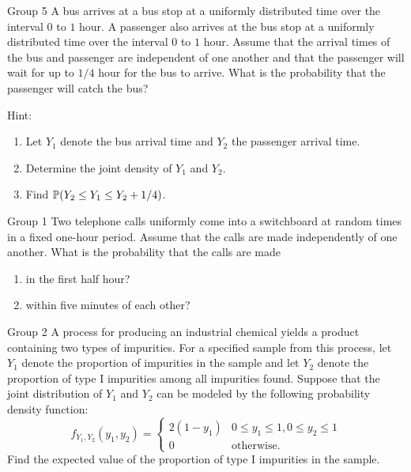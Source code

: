 \documentclass{article}
\begin{document}
\begin{problem}
    {Group 5}
    A bus arrives at a bus stop at a uniformly distributed time over the interval $0$ to $1$ hour. A passenger also arrives at the bus stop at a uniformly distributed time over the interval $0$ to $1$ hour. Assume that the arrival times of the bus and passenger are independent of one another and that the passenger will wait for up to $1/4$ hour for the bus to arrive. What is the probability that the passenger will catch the bus?
    \begin{solution}
        {Hint:}
        \begin{enumerate}
            \item Let $Y_1$ denote the bus arrival time and $Y_2$ the passenger arrival time.
            \item Determine the joint density of $Y_1$ and $Y_2$.
            \item Find $\P{Y_2 \leq Y_1 \leq Y_2 + 1/4}$.
        \end{enumerate}
    \end{solution}
\end{problem}
\fi
\iffalse
\begin{problem}
    {Group 1}
    Two telephone calls uniformly come into a switchboard at random times in a fixed one-hour period. Assume that the calls are made independently of one another. What is the probability that the calls are made
    \begin{enumerate}
        \item in the first half hour?
        \item within five minutes of each other?
    \end{enumerate}
\end{problem}

\begin{problem}
    {Group 2}
    A process for producing an industrial chemical yields a product containing two types of impurities. For a specified sample from this process, let $Y_1$ denote the proportion of impurities in the sample and let $Y_2$ denote the proportion of type I impurities among all impurities found. Suppose that the joint distribution of $Y_1$ and $Y_2$ can be modeled by the following probability density function:
    \[
    f_{Y_1,Y_2}(y_1,y_2)={
        \begin{cases}
            2(1-y_1) & 0\leq y_1\leq1, 0\leq y_2\leq 1\\
            0 & \text{otherwise.}
        \end{cases}
    }
    \]
    Find the expected value of the proportion of type I impurities in the sample.
\end{problem}
\end{document}

